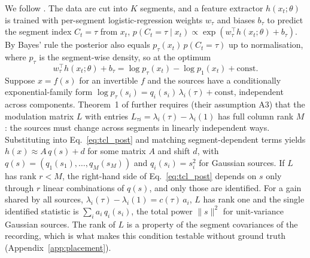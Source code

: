We follow \citet{hyvarinen2016tcl}.
The data are cut into $K$ segments, and a feature extractor $h(x_t; \theta)$ is trained with per-segment logistic-regression weights $w_\tau$ and biases $b_\tau$ to predict the segment index $C_t = \tau$ from $x_t$, $p(C_t = \tau \mid x_t) \propto \exp(w_\tau^\top h(x_t; \theta) + b_\tau)$.
By Bayes' rule the posterior also equals $p_\tau(x_t)\, p(C_t = \tau)$ up to normalisation, where $p_\tau$ is the segment-wise density, so at the optimum
\begin{equation}
  w_\tau^\top h(x_t; \theta) + b_\tau = \log p_\tau(x_t) - \log p_1(x_t) + \mathrm{const}.
  \label{eq:tcl_post}
\end{equation}
Suppose $x = f(s)$ for an invertible $f$ and the sources have a conditionally exponential-family form $\log p_\tau(s_i) = q_i(s_i)\,\lambda_i(\tau) + \mathrm{const}$, independent across components.
Theorem~1 of \citet{hyvarinen2016tcl} further requires (their assumption A3) that the modulation matrix $L$ with entries $L_{\tau i} = \lambda_i(\tau) - \lambda_i(1)$ has full column rank $M$: the sources must change across segments in linearly independent ways.
Substituting into Eq.~\eqref{eq:tcl_post} and matching segment-dependent terms yields $h(x) \approx A\, q(s) + d$ for some matrix $A$ and shift $d$, with $q(s) = (q_1(s_1), \dots, q_M(s_M))$ and $q_i(s_i) = s_i^2$ for Gaussian sources.
If $L$ has rank $r < M$, the right-hand side of Eq.~\eqref{eq:tcl_post} depends on $s$ only through $r$ linear combinations of $q(s)$, and only those are identified.
For a gain shared by all sources, $\lambda_i(\tau) - \lambda_i(1) = c(\tau)\, a_i$, $L$ has rank one and the single identified statistic is $\sum_i a_i\, q_i(s_i)$, the total power $\|s\|^2$ for unit-variance Gaussian sources.
The rank of $L$ is a property of the segment covariances of the recording, which is what makes this condition testable without ground truth (Appendix~\ref{app:placement}).
